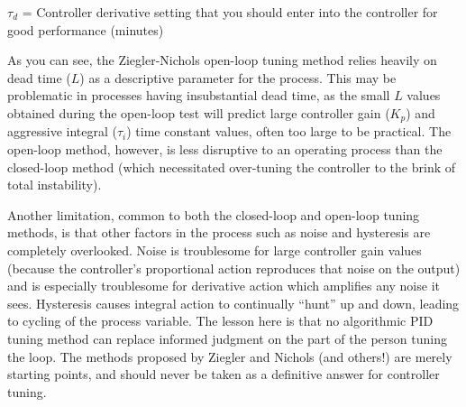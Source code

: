 $\tau_d$ = Controller derivative setting that you should enter into the controller for good performance (minutes)

\vskip 10pt

As you can see, the Ziegler-Nichols open-loop tuning method relies heavily on dead time ($L$) as a descriptive parameter for the process.  This may be problematic in processes having insubstantial dead time, as the small $L$ values obtained during the open-loop test will predict large controller gain ($K_p$) and aggressive integral ($\tau_i$) time constant values, often too large to be practical.  The open-loop method, however, is less disruptive to an operating process than the closed-loop method (which necessitated over-tuning the controller to the brink of total instability).

Another limitation, common to both the closed-loop and open-loop tuning methods, is that other factors in the process such as noise and hysteresis are completely overlooked.  Noise is troublesome for large controller gain values (because the controller's proportional action reproduces that noise on the output) and is especially troublesome for derivative action which amplifies any noise it sees.  Hysteresis causes integral action to continually ``hunt'' up and down, leading to cycling of the process variable.  The lesson here is that no algorithmic PID tuning method can replace informed judgment on the part of the person tuning the loop.  The methods proposed by Ziegler and Nichols (and others!) are merely starting points, and should never be taken as a definitive answer for controller tuning.

























